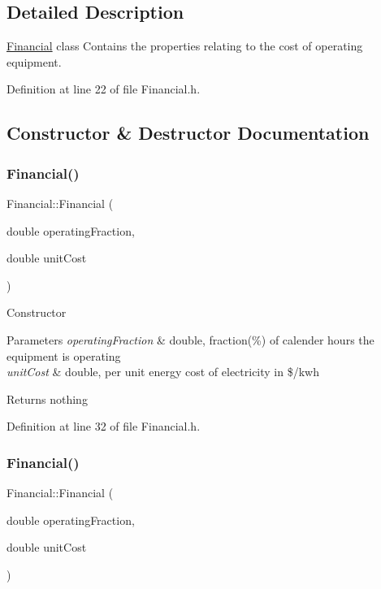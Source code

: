 \subsection{Detailed Description}
\hyperlink{class_financial}{Financial} class Contains the properties relating to the cost of operating equipment. 

Definition at line 22 of file Financial.\+h.



\subsection{Constructor \& Destructor Documentation}
\mbox{\label{class_financial_abe8c4d82e9aede125e7e42ad3d53f90a}} 
\subsubsection{\texorpdfstring{Financial()}{Financial()}\hspace{0.1cm}{\footnotesize\ttfamily [1/3]}}
{\footnotesize\ttfamily Financial\+::\+Financial (\begin{DoxyParamCaption}\item[{double}]{operating\+Fraction,  }\item[{double}]{unit\+Cost }\end{DoxyParamCaption})\hspace{0.3cm}{\ttfamily [inline]}}

Constructor 
\begin{DoxyParams}{Parameters}
{\em operating\+Fraction} & double, fraction(\%) of calender hours the equipment is operating \\
\hline
{\em unit\+Cost} & double, per unit energy cost of electricity in \$/kwh \\
\hline
\end{DoxyParams}
\begin{DoxyReturn}{Returns}
nothing 
\end{DoxyReturn}


Definition at line 32 of file Financial.\+h.

\mbox{\label{class_financial_abe8c4d82e9aede125e7e42ad3d53f90a}} 
\subsubsection{\texorpdfstring{Financial()}{Financial()}\hspace{0.1cm}{\footnotesize\ttfamily [2/3]}}
{\footnotesize\ttfamily Financial\+::\+Financial (\begin{DoxyParamCaption}\item[{double}]{operating\+Fraction,  }\item[{double}]{unit\+Cost }\end{DoxyParamCaption})\hspace{0.3cm}{\ttfamily [inline]}}

